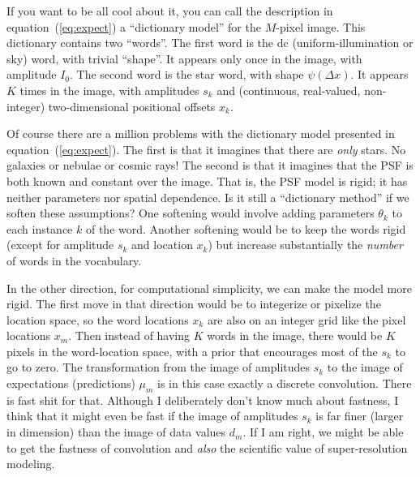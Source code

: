 \documentclass[12pt]{article}
\begin{document}
If you want to be all cool about it, you can call the description in
equation~(\ref{eq:expect}) a ``dictionary model'' for the $M$-pixel
image.
This dictionary contains two ``words''.
The first word is the dc (uniform-illumination or sky) word, with
trivial ``shape''.
It appears only once in the image, with amplitude $I_0$.
The second word is the star word, with shape $\psi(\Delta x)$.  It
appears $K$ times in the image, with amplitudes $s_k$ and (continuous,
real-valued, non-integer) two-dimensional positional offsets $x_k$.

Of course there are a million problems with the dictionary model
presented in equation~(\ref{eq:expect}).
The first is that it imagines that there are \emph{only} stars.
No galaxies or nebulae or cosmic rays!
The second is that it imagines that the PSF is both known and constant
over the image.
That is, the PSF model is rigid; it has neither parameters nor spatial
dependence.
Is it still a ``dictionary method'' if we soften these assumptions?
One softening would involve adding parameters $\theta_k$ to each
instance $k$ of the word.
Another softening would be to keep the words rigid (except for
amplitude $s_k$ and location $x_k$) but increase substantially the
\emph{number} of words in the vocabulary.

In the other direction, for computational simplicity, we can make the
model more rigid.
The first move in that direction would be to integerize or pixelize
the location space, so the word locations $x_k$ are also on an integer
grid like the pixel locations $x_m$.
Then instead of having $K$ words in the image, there would be $K$
pixels in the word-location space, with a prior that encourages most
of the $s_k$ to go to zero.
The transformation from the image of amplitudes $s_k$ to the image of
expectations (predictions) $\mu_m$ is in this case exactly a discrete
convolution.
There is fast shit for that.
Although I deliberately don't know much about fastness, I think that
it might even be fast if the image of amplitudes $s_k$ is far finer
(larger in dimension) than the image of data values $d_m$.
If I am right, we might be able to get the fastness of convolution and
\emph{also} the scientific value of super-resolution modeling.
\end{document}
